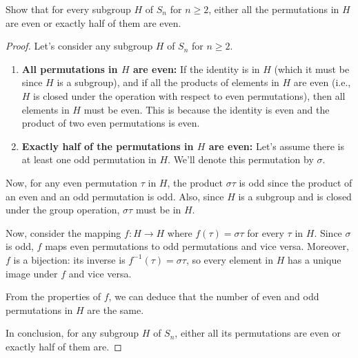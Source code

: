 \documentclass[12pt]{amsart}
\theoremstyle{definition}
\numberwithin{equation}{section}
\theoremstyle{plain}
\begin{document}
\begin{exercise}{29} Show that for every subgroup $H$ of $S_n$ for $n \geq 2$, either all the permutations in $H$ are even or exactly half of them are even.
        
    \begin{proof}
        Let's consider any subgroup \( H \) of \( S_n \) for \( n \geq 2 \).
        
        \begin{enumerate}
            \item \textbf{All permutations in \( H \) are even:}
            If the identity is in \( H \) (which it must be since \( H \) is a subgroup), and if all the products of elements in \( H \) are even (i.e., \( H \) is closed under the operation with respect to even permutations), then all elements in \( H \) must be even. This is because the identity is even and the product of two even permutations is even.
            
            \item \textbf{Exactly half of the permutations in \( H \) are even:}
            Let's assume there is at least one odd permutation in \( H \). We'll denote this permutation by \( \sigma \). 
        \end{enumerate}
        
        Now, for any even permutation \( \tau \) in \( H \), the product \( \sigma\tau \) is odd since the product of an even and an odd permutation is odd. Also, since \( H \) is a subgroup and is closed under the group operation, \( \sigma\tau \) must be in \( H \).
        
        Now, consider the mapping \( f: H \rightarrow H \) where \( f(\tau) = \sigma\tau \) for every \( \tau \) in \( H \). Since \( \sigma \) is odd, \( f \) maps even permutations to odd permutations and vice versa. Moreover, \( f \) is a bijection: its inverse is \( f^{-1}(\tau) = \sigma\tau \), so every element in \( H \) has a unique image under \( f \) and vice versa.
        
        From the properties of \( f \), we can deduce that the number of even and odd permutations in \( H \) are the same. 
        
        In conclusion, for any subgroup \( H \) of \( S_n \), either all its permutations are even or exactly half of them are.
        \end{proof}
\end{exercise}
\end{document}
